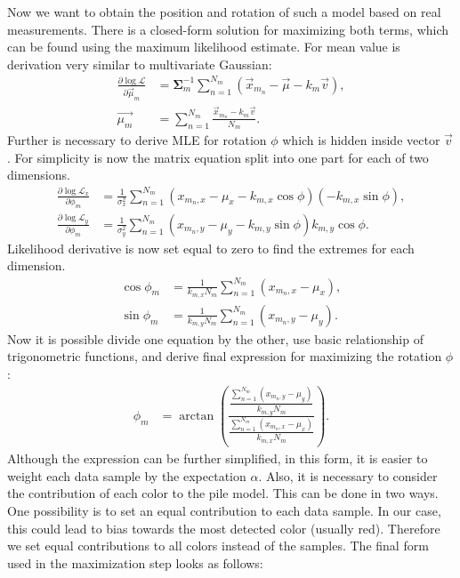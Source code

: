  Now we want to obtain the position and rotation of such a model based on real measurements. There is a closed-form solution for maximizing both terms, which can be found using the maximum likelihood estimate. For mean value is derivation very similar to multivariate Gaussian:
\begin{align}
\frac{\partial \log\mathcal{L} }{\partial \vec{\mu}_m} &=  \bm{\Sigma}^{-1}_m \sum_{n = 1}^{N_m} (\vec{x}_{m_n} - \vec{\mu} - k_m \vec{v}), \\
\vec{\mu_m} &= \sum_{n = 1}^{N_m} \frac{\vec{x}_{m_n} - k_m \vec{v}}{N_m}.
\end{align}
Further is necessary to derive MLE for rotation $\phi$ which is hidden inside vector $\vec{v}$. For simplicity is now the matrix equation split into one part for each of two dimensions.  
\begin{align}
\frac{\partial \log\mathcal{L}_x }{\partial \phi_m} &= \frac{1}{\sigma^2_x} \sum_{n=1}^{N_m} (x_{m_n, x} - \mu_x - k_{m, x} \cos \phi) \left( -k_{m,x} \sin \phi\right),  \\
\frac{\partial \log\mathcal{L}_y }{\partial \phi_m} &= \frac{1}{\sigma^2_y} \sum_{n=1}^{N_m} (x_{m_n, y} - \mu_y - k_{m, y} \sin \phi) k_{m,y} \cos \phi.
\end{align}
Likelihood derivative is now set equal to zero to find the extremes for each dimension.
\begin{align}
\cos \phi_m &= \frac{1}{k_{m, x}N_m} \sum_{n = 1}^{N_m} \left(  x_{m_n, x} - \mu_x \right)  , \\ 
\sin \phi_m &=  \frac{1}{k_{m, y}N_m} \sum_{n = 1}^{N_m} \left(  x_{m_n, y} - \mu_y \right)  .
\end{align}
Now it is possible divide one equation by the other, use basic relationship of trigonometric functions, and derive final expression for maximizing the rotation $\phi$:
\begin{align}
\phi_m &= \arctan \left( \frac{\dfrac{\sum_{n = 1}^{N_m} \left( x_{m_n, y} - \mu_y \right)}{k_{m, y}N_m} }{ \dfrac{\sum_{n = 1}^{N_m} \left( x_{m_n, x} - \mu_x \right)}{k_{m, x}N_m} }\right).
\end{align}
Although the expression can be further simplified, in this form, it is easier to weight each data sample by the expectation $\alpha$. Also, it is necessary to consider the contribution of each color to the pile model. This can be done in two ways. One possibility is to set an equal contribution to each data sample. In our case, this could lead to bias towards the most detected color (usually red). Therefore we set equal contributions to all colors instead of the samples. The final form used in the maximization step looks as follows:

